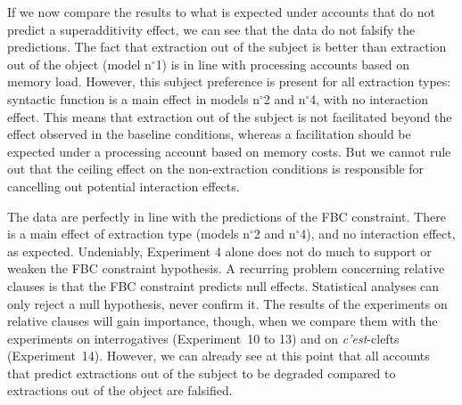 If we now compare the results to what is expected under accounts that do not predict a superadditivity effect, we can see that the data do not falsify the predictions. The fact that extraction out of the subject is better than extraction out of the object (model n$^{\circ}$1) is in line with processing accounts based on memory load. However, this subject preference is present for all extraction types: syntactic function is a main effect in models n$^{\circ}$2 and n$^{\circ}$4, with no interaction effect. This means that extraction out of the subject is not facilitated beyond the effect observed in the baseline conditions, whereas a facilitation should be expected under a processing account based on memory costs. But we cannot rule out that the ceiling effect on the non-extraction conditions is responsible for cancelling out potential interaction effects.

The data are perfectly in line with the predictions of the FBC constraint. There is a main effect of extraction type (models n$^{\circ}$2 and n$^{\circ}$4), and no interaction effect, as expected. Undeniably, Experiment 4 alone does not do much to support or weaken the FBC constraint hypothesis. A recurring problem concerning relative clauses is that the FBC constraint predicts null effects. Statistical analyses can only reject a null hypothesis, never confirm it. The results of the experiments on relative clauses will gain importance, though, when we compare them with the experiments on interrogatives (Experiment~10 to 13) and on \emph{c'est}-clefts (Experiment~14). However, we can already see at this point that all accounts that predict extractions out of the subject to be degraded compared to extractions out of the object are falsified.

